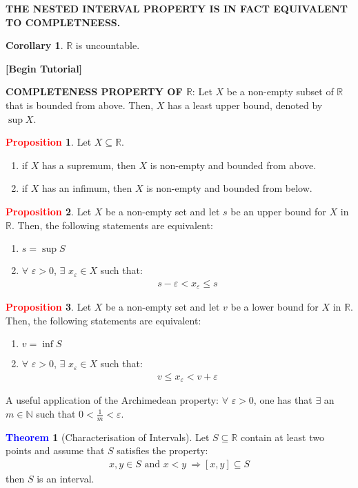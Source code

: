\documentclass[11pt]{article}
\theoremstyle{definition}
\newcommand{\R}[0]{\mathbb{R}}
\newtheorem{theorem}{\textcolor{blue}{Theorem}}
\newtheorem{corollary}{Corollary}
\theoremstyle{definition}
\newtheorem{prop}{\textcolor{red}{Proposition}}
\theoremstyle{remark}
\begin{document}
\begin{center}
	\textbf{THE NESTED INTERVAL PROPERTY IS IN FACT EQUIVALENT TO COMPLETNEESS.}
\end{center}

\begin{corollary}
	$\R$ is uncountable.
\end{corollary}

\begin{center}
	\textbf{[Begin Tutorial]}
\end{center}

\textbf{COMPLETENESS PROPERTY OF $\R$}: Let $X$ be a non-empty subset of $\R$ that is bounded from above. Then, $X$ has a least upper bound, denoted by $\sup{X}$. 


\begin{prop}
	Let $X \subseteq \R$. 
	\begin{enumerate}[noitemsep]
		\item if $X$ has a supremum, then $X$ is non-empty and bounded from above. 
		\item if $X$ has an infimum, then $X$ is non-empty and bounded from below.
	\end{enumerate}
\end{prop}


\begin{prop}
	Let $X$ be a non-empty set and let $s$ be an upper bound for $X$ in $\R$. Then, the following statements are equivalent: 
	\begin{enumerate}[noitemsep]
		\item $s = \sup{S}$
		\item $\forall $ $\varepsilon > 0$, $\exists$ $x_\varepsilon \in X$ such that:
		\begin{align}
			s - \varepsilon < x_\varepsilon \leq s	
		\end{align}
	\end{enumerate}
\end{prop}

\begin{prop}
	Let $X$ be a non-empty set and let $v$ be a lower bound for $X$ in $\R$. Then, the following statements are equivalent: 
	\begin{enumerate}[noitemsep]
		\item $v = \inf{S}$
		\item $\forall $ $\varepsilon > 0$, $\exists$ $x_\varepsilon \in X$ such that:
		\begin{align}
			v \leq x_\varepsilon < v + \varepsilon	
		\end{align}
	\end{enumerate}
\end{prop}
A useful application of the Archimedean property: $\forall $ $\varepsilon > 0$, one has that $\exists$ an $m \in \mathbb{N}$ such that $0 < \frac{1}{m} < \varepsilon$. 

\begin{theorem}[Characterisation of Intervals]
	Let $S \subseteq \R$ contain at least two points and assume that $S$ satisfies the property:
	\begin{align} 	
		x, y \in S \text{ and } x < y\ \Rightarrow [x,y] \subseteq S	
	\end{align}
	then $S$ is an interval.
\end{theorem}
\end{document}
